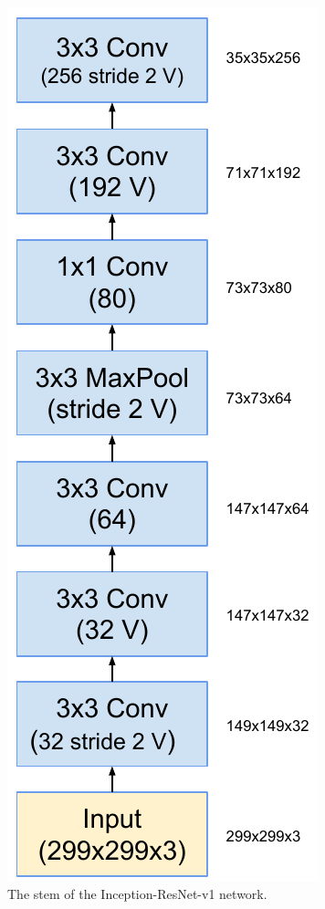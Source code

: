\begin{figure}
\centering
\includegraphics[width=0.5\linewidth]{ResnetSmallStem}
\caption{The stem of the Inception-ResNet-v1 network.}
\label{fig:resnetsmallstem}
\end{figure}
